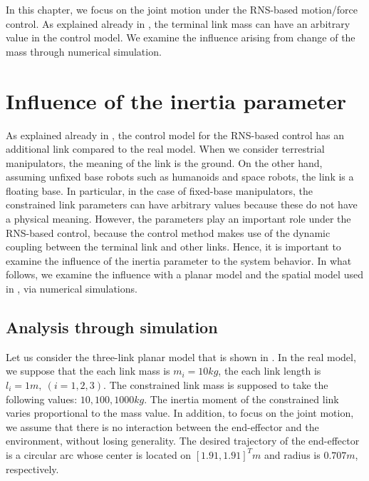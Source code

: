 %
In this chapter,
we focus on the joint motion under the RNS-based motion/force control.
As explained already in ,
the terminal link mass can have an arbitrary value in the control model.
We examine the influence arising from change of the mass through numerical simulation.

\section{Influence of the inertia parameter}

As explained already in ,
the control model for the RNS-based control has an additional link
compared to the real model.
When we consider terrestrial manipulators,
the meaning of the link is the ground.
On the other hand,
assuming unfixed base robots such as humanoids and space robots,
the link is a floating base.
In particular,
in the case of fixed-base manipulators,
the constrained link parameters can have arbitrary values because these do not have a physical meaning.
However, the parameters play an important role under the RNS-based control,
because the control method makes use of the dynamic coupling between the terminal link and other links.
Hence, it is important to examine the influence of the inertia parameter to the system behavior.
In what follows,
we examine the influence with a planar model and the spatial model used in ,
via numerical simulations.

\subsection{Analysis through simulation}
\label{sec:ANALYSIS_MOTION}
Let us consider the three-link planar model that is shown in .
In the real model,
we suppose that the each link mass is $m_{i} = 10\unit{kg}$,
the each link length is $l_{i} = 1\unit{m},~(i = 1,2,3)$.
The constrained link mass is supposed to take the following values: $10,100,1000\unit{kg}$.
The inertia moment of the constrained link varies proportional to the mass value.
In addition,
to focus on the joint motion,
we assume that there is no interaction between the end-effector and the environment,
without losing generality.
The desired trajectory of the end-effector is a circular arc whose center is located on
$[1.91,1.91]^{T}\unit{m}$ and radius is $0.707\unit{m}$, respectively.


